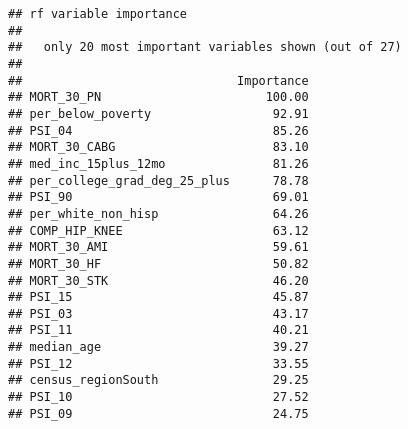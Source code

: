 \documentclass[
]{article}
\begin{document}
\begin{verbatim}
## rf variable importance
## 
##   only 20 most important variables shown (out of 27)
## 
##                              Importance
## MORT_30_PN                       100.00
## per_below_poverty                 92.91
## PSI_04                            85.26
## MORT_30_CABG                      83.10
## med_inc_15plus_12mo               81.26
## per_college_grad_deg_25_plus      78.78
## PSI_90                            69.01
## per_white_non_hisp                64.26
## COMP_HIP_KNEE                     63.12
## MORT_30_AMI                       59.61
## MORT_30_HF                        50.82
## MORT_30_STK                       46.20
## PSI_15                            45.87
## PSI_03                            43.17
## PSI_11                            40.21
## median_age                        39.27
## PSI_12                            33.55
## census_regionSouth                29.25
## PSI_10                            27.52
## PSI_09                            24.75
\end{verbatim}
\end{document}
